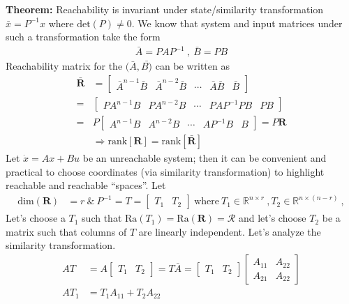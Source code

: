 \documentclass[twoside]{article}
\begin{document}
\textbf{Theorem:} Reachability is invariant under state/similarity transformation $\bar{x} = P^{-1} x$ where $\mathrm{det}(P) \neq 0$. 
We know that system and input matrices under such a transformation take the form
\begin{align*}
    \bar{A} = P A P^{-1} \ , \ \bar{B} = P B
\end{align*}
%
Reachability matrix for the $(\bar{A},\bar{B)}$ can be written as
%
\begin{align*}
   \bar{\mathbf{R}} &= \left[ \begin{array}{c|c|c|c|c} \bar{A}^{n-1} \bar{B} & \bar{A}^{n-2} \bar{B} & \cdots & \bar{A} \bar{B} & \bar{B} \end{array} \right] 
   \\
    =& \left[ \begin{array}{c|c|c|c|c} P A^{n-1} B & P A^{n-2} B & \cdots & P A P^{-1} P B & P B \end{array} \right] 
    \\
    =& P \left[ \begin{array}{c|c|c|c|c} A^{n-1} B & A^{n-2} B & \cdots & A P^{-1} B & B \end{array} \right] = P \mathbf{R}
    \\
    &\Rightarrow \mathrm{rank} [ \mathbf{R} ] = \mathrm{rank} [ \mathbf{\bar{R}} ]
\end{align*}
%
Let $\dot{x} = A x + B u$ be an unreachable system; then it can be convenient and practical to choose coordinates (via similarity transformation)
to highlight reachable and reachable ``spaces''. Let 
%
\begin{align*}
   \mathrm{dim}({\mathbf{R}}) &= r 
   \ \& \
   P^{-1} = T = \left[ \begin{array}{c|c} T_1 & T_2  \end{array} \right] \ \mathrm{where} \ T_1 \in \mathbb{R}^{n \times r} \ , 
   T_2 \in \mathbb{R}^{n \times (n-r)} \ , 
\end{align*}
%
Let's choose a $T_1$ such that $\mathrm{Ra}(T_1) = \mathrm{Ra}(\mathbf{R}) = \mathcal{R}$ and let's choose $T_2$ be a matrix such that 
columns of $T$ are linearly independent. Let's analyze the similarity transformation. 
%
%
\begin{align*}
    A T &=  A \left[ \begin{array}{c|c} T_1 & T_2  \end{array} \right] = T \bar{A} = \left[ \begin{array}{c|c} T_1 & T_2  \end{array} \right]
    \left[ \begin{array}{c|c} A_{11} & A_{22} \\ \hline A_{21} & A_{22}  \end{array} \right]
    \\
    A T_1 &= T_1 A_{11} + T_2 A_{22}
\end{align*}
\end{document}

